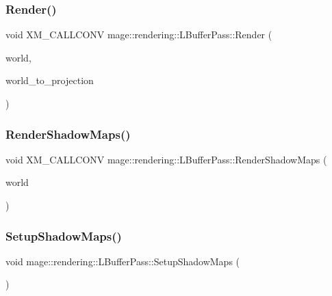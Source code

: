 \subsubsection{\texorpdfstring{Render()}{Render()}}
{\footnotesize\ttfamily void X\+M\+\_\+\+C\+A\+L\+L\+C\+O\+NV mage\+::rendering\+::\+L\+Buffer\+Pass\+::\+Render (\begin{DoxyParamCaption}\item[{const \mbox{\hyperlink{classmage_1_1rendering_1_1_world}{World}} \&}]{world,  }\item[{F\+X\+M\+M\+A\+T\+R\+IX}]{world\+\_\+to\+\_\+projection }\end{DoxyParamCaption})}

\mbox{\label{classmage_1_1rendering_1_1_l_buffer_pass_a811b69ff4df7d8a24a042a9677c4b67f}} 
\subsubsection{\texorpdfstring{Render\+Shadow\+Maps()}{RenderShadowMaps()}}
{\footnotesize\ttfamily void X\+M\+\_\+\+C\+A\+L\+L\+C\+O\+NV mage\+::rendering\+::\+L\+Buffer\+Pass\+::\+Render\+Shadow\+Maps (\begin{DoxyParamCaption}\item[{const \mbox{\hyperlink{classmage_1_1rendering_1_1_world}{World}} \&}]{world }\end{DoxyParamCaption})\hspace{0.3cm}{\ttfamily [private]}}

\mbox{\label{classmage_1_1rendering_1_1_l_buffer_pass_a405734dad82467908e68217254e4f2ad}} 
\subsubsection{\texorpdfstring{Setup\+Shadow\+Maps()}{SetupShadowMaps()}}
{\footnotesize\ttfamily void mage\+::rendering\+::\+L\+Buffer\+Pass\+::\+Setup\+Shadow\+Maps (\begin{DoxyParamCaption}{ }\end{DoxyParamCaption})\hspace{0.3cm}{\ttfamily [private]}}

